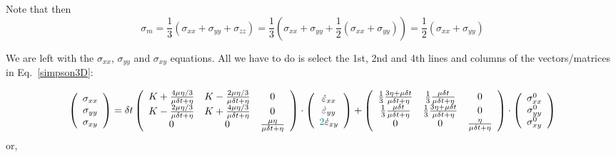 Note that then
\[
\sigma_m 
= \frac{1}{3}(\sigma_{xx}+\sigma_{yy}+\sigma_{zz})
= \frac{1}{3}(\sigma_{xx}+\sigma_{yy}+\frac12(\sigma_{xx}+\sigma_{yy}))
= \frac{1}{2}(\sigma_{xx}+\sigma_{yy})
\]




We are left with the $\sigma_{xx}$, $\sigma_{yy}$ and $\sigma_{xy}$
equations. All we have to do is select the 1st, 2nd and 4th lines and columns of the vectors/matrices in Eq.~\eqref{simpson3D}:

\[
\left(
\begin{array}{c}
\sigma_{xx}\\ 
\sigma_{yy}\\ 
\sigma_{xy} 
\end{array}
\right)
=
\delta t
\left(
\begin{array}{ccc}
K + \frac{4\mu \eta/3}{\mu \delta t + \eta} &
K - \frac{2\mu \eta/3}{\mu \delta t + \eta} &
0 \\
K - \frac{2\mu \eta/3}{\mu \delta t + \eta} &
K + \frac{4\mu \eta/3}{\mu \delta t + \eta} &
0  \\
0 & 0 & \frac{\mu \eta }{\mu \delta t + \eta}  \\
\end{array}
\right)
\cdot
\left(
\begin{array}{c}
\dot\varepsilon_{xx}\\ 
\dot\varepsilon_{yy}\\ 
{\color{teal}2}\dot\varepsilon_{xy} 
\end{array}
\right) 
+
\left(
\begin{array}{cccccc}
\frac13\frac{3\eta + \mu \delta t}{\mu\delta t+\eta} & 
\frac13\frac{\mu \delta t}{\mu\delta t+\eta} & 
0\\
\frac13\frac{\mu \delta t}{\mu\delta t+\eta} & 
\frac13\frac{3\eta + \mu \delta t}{\mu\delta t+\eta} & 
0\\
0 & 0 & \frac{ \eta}{\mu\delta t + \eta}  
\end{array}
\right)
\cdot
\left(
\begin{array}{c}
\sigma_{xx}^0\\ 
\sigma_{yy}^0\\ 
\sigma_{xy}^0 
\end{array}
\right) 
\]
or,
